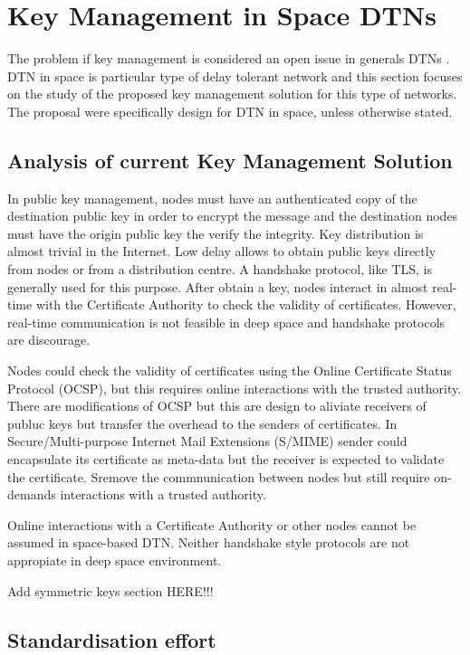 \section{Key Management in Space DTNs}
\label{sec:survey}


The problem if key management is considered an open issue in generals DTNs \cite{menesidou2016automated}. DTN in space is particular type of delay tolerant network and this section focuses on the study of the proposed key management solution for this type of networks.  The proposal were specifically design for DTN in space, unless otherwise stated.

\subsection{Analysis of current Key Management Solution}

In public key management, nodes must have an authenticated copy of the destination public key in order to encrypt the message and the destination nodes must have the origin public key the verify the integrity. Key distribution is almost trivial in the Internet. Low delay allows to obtain public keys directly from nodes or from a distribution centre. A handshake protocol, like TLS,  is generally used for this purpose. After obtain a key, nodes interact in almost real-time with the Certificate Authority to check the validity of certificates. However, real-time communication is not feasible in deep space and handshake protocols are discourage. 

Nodes could check the validity of certificates using the Online Certificate Status Protocol (OCSP), but this requires online interactions with the trusted authority. There are modifications of OCSP but this are design to aliviate receivers of publuc keys but transfer the overhead to the senders of certificates. In Secure/Multi-purpose Internet Mail Extensions (S/MIME) sender could encapsulate its certificate as meta-data but the receiver is expected to validate the certificate. S\MIME remove the commnunication between nodes but still require on-demands interactions with a trusted authority.

Online interactions with a Certificate Authority or other nodes cannot be assumed in space-based DTN. Neither handshake style protocols are not appropiate in deep space environment.  

Add symmetric keys section HERE!!!



\subsection{Standardisation effort}

